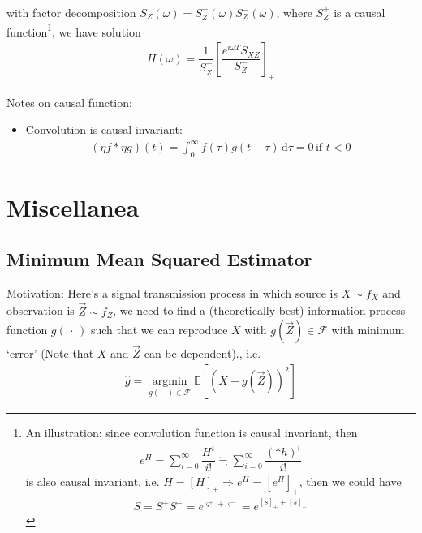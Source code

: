 with factor decomposition $ S_Z(\omega )=S_Z^+(\omega )S_Z^-(\omega ) $, where $ S_Z^+ $ is a causal function\footnote{An illustration: since convolution function is causal invariant, then
\begin{align}
    e^H=\sum_{i=0}^\infty \dfrac{H^i}{i!}\fallingdotseq \sum_{i=0}^\infty \dfrac{(* h)^i}{i!} 
\end{align}
is also causal invariant, i.e. $ H=[H]_+\Rightarrow e^H=[e^H]_+ $, then we could have
\begin{align}
    S=S^+S^-=e^{\varsigma^++\varsigma^-}=e^{[s]_++[s]_-}
\end{align}
}, we have solution
\begin{align}
    H(\omega )=\dfrac{1}{S_Z^+}\left[\dfrac{e^{i\omega T}S_{XZ}}{S_Z^-}\right]_+ 
\end{align}


Notes on causal function:
\begin{itemize}[topsep=2pt,itemsep=0pt]
    \item Convolution is causal invariant:
    \begin{align}
        (\eta f * \eta g)(t) = \int_0^\infty f(\tau)g(t-\tau) \,\mathrm{d}\tau = 0 \,\text{if }t<0
    \end{align}
\end{itemize}

    










\section{Miscellanea}

\subsection{Minimum Mean Squared Estimator}\label{SubSecMMSE}
    Motivation: Here's a signal transmission process in which source is $ X\sim f_{X} $ and observation is $ \vec{Z}\sim f_Z $, we need to find a (theoretically best) information process function $ g(\, \cdot \, ) $ such that we can reproduce $ X $ with $ g(\vec{Z})\in\mathscr{F} $ with minimum `error' (Note that $ X$ and $\vec{Z} $ can be dependent)., i.e.
    \begin{align}
        \hat{g}=\mathop{\arg\min}\limits_{g(\, \cdot \, )\in \mathscr{F}} \mathbb{E}\left[ (X-g(\vec{Z}))^2 \right] 
    \end{align}

